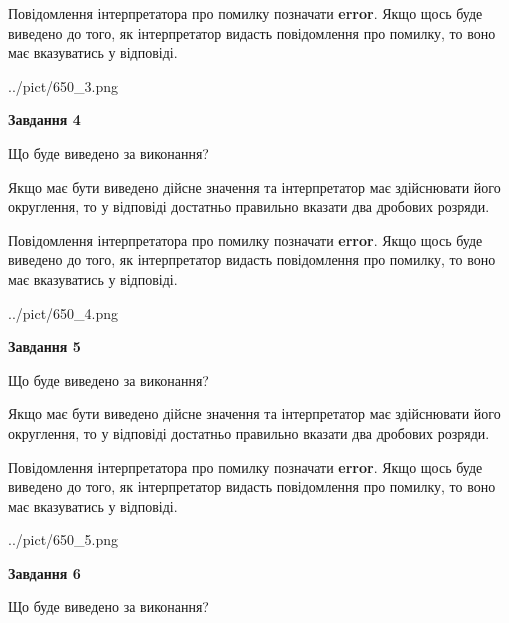 \documentclass[12pt, ukrainian]{article}
\begin{document}
{\begin {Large}
Повідомлення інтерпретатора про помилку позначати \textbf{error}.
Якщо щось буде виведено до того, як інтерпретатор видасть повідомлення про помилку, 
то воно має вказуватись у відповіді. \par

\begin{center}
	{../pict/650_3.png}
\end{center}
\newpage

{\begin {center}\textbf{Завдання 4}\end {center}}\par
Що буде виведено за виконання? \par

Якщо має бути виведено дійсне значення та інтерпретатор має здійснювати його округлення, 
то у відповіді достатньо правильно вказати два дробових розряди.

Повідомлення інтерпретатора про помилку позначати \textbf{error}.
Якщо щось буде виведено до того, як інтерпретатор видасть повідомлення про помилку, 
то воно має вказуватись у відповіді. \par

\begin{center}
	{../pict/650_4.png}
\end{center}
\newpage

{\begin {center}\textbf{Завдання 5}\end {center}}\par
Що буде виведено за виконання? \par

Якщо має бути виведено дійсне значення та інтерпретатор має здійснювати його округлення, 
то у відповіді достатньо правильно вказати два дробових розряди.

Повідомлення інтерпретатора про помилку позначати \textbf{error}.
Якщо щось буде виведено до того, як інтерпретатор видасть повідомлення про помилку, 
то воно має вказуватись у відповіді. \par

\begin{center}
	{../pict/650_5.png}
\end{center}
\newpage

{\begin {center}\textbf{Завдання 6}\end {center}}\par
Що буде виведено за виконання? \par


\end{Large}}
\end{document}
